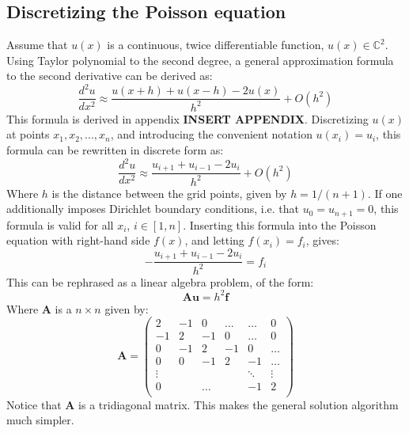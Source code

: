 \documentclass[a4paper, 10pt]{article}
\begin{document}
\subsection{Discretizing the Poisson equation}\label{Discretize_Poisson}
Assume that $u(x)$ is a continuous, twice differentiable function, $u(x) \in \mathbb{C}^2$. Using Taylor polynomial to the second degree, a general approximation formula to the second derivative can be derived as:
\begin{equation}\label{eq:continuous_derivative}
\frac{d^2 u}{dx^2}\approx \frac{u(x+h)+u(x-h)-2u(x)}{h^2}+O(h^2)
\end{equation}
This formula is derived in appendix \textbf{INSERT APPENDIX}. Discretizing $u(x)$ at points $x_1, x_2, ..., x_n$, and  introducing the convenient notation $u(x_i)=u_i$, this formula can be rewritten in discrete form as:
\begin{equation}\label{eq:discrete_Poisson}
\frac{d^2 u}{dx^2}\approx \frac{u_{i+1}+u_{i-1}-2u_{i}}{h^2}+O(h^2)
\end{equation}
Where $h$ is the distance between the grid points, given by $h=1/(n+1)$. If one additionally imposes Dirichlet boundary conditions, i.e. that $u_0=u_{n+1}=0$, this formula is valid for all $x_i$, $i\in [1, n]$. Inserting this formula into the Poisson equation with right-hand side $f(x)$, and letting $f(x_i)=f_i$, gives:
\begin{equation}\label{Poisson}
-\frac{u_{i+1}+u_{i-1}-2u_{i}}{h^2}=f_i
\end{equation}\label{Poisson}
This can be rephrased as a linear algebra problem, of the form:
$$\mathbf{A}\mathbf{u}=h^2\mathbf{f}$$
Where $\mathbf{A}$ is a $n \times n$ given by:
$$\mathbf{A}=\begin{pmatrix}
2 & -1 & 0 & \ldots &  \ldots & 0\\
-1 & 2 & -1  & 0 & \ldots & 0\\
0 & -1 & 2 &-1 & 0 & \ldots \\
0 & 0 & -1 & 2 &-1 &\ldots\\
\vdots &  & &  &\ddots & \vdots \\
0 && \ldots && -1&  2  \\
\end{pmatrix}$$
Notice that $\mathbf{A}$ is a tridiagonal matrix. This makes the general solution algorithm much simpler.
\end{document}
